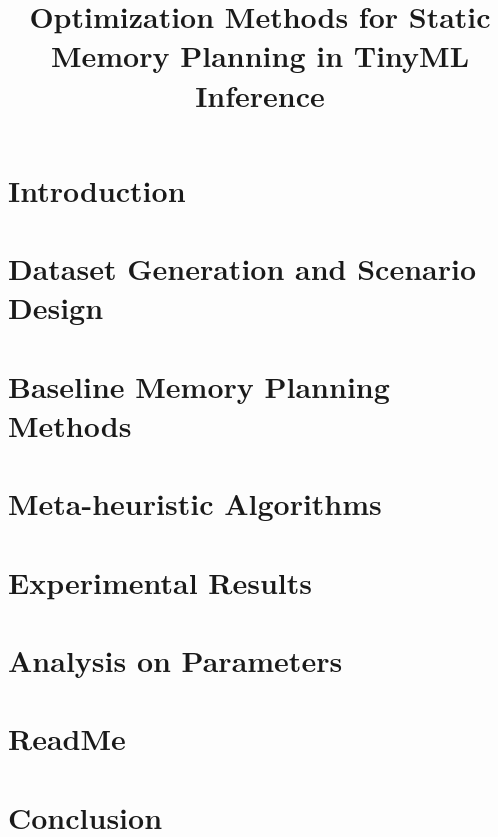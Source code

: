 \documentclass[12pt,oneside,a4paper,english]{article}
\title{Optimization Methods for Static Memory Planning in TinyML Inference} %
\begin{document}


\newpage
\doublespacing
\renewcommand{\baselinestretch}{1}\normalsize
\tableofcontents
\renewcommand{\baselinestretch}{1}\normalsize
\thispagestyle{fancy} %




\newpage
{} 
\section{Introduction} \label{ch1}
 

\section{Dataset Generation and Scenario Design} \label{ch2}
 


\section{Baseline Memory Planning Methods} \label{ch3}
 


\section{Meta-heuristic Algorithms} \label{ch4}
 



\section{Experimental Results}\label{ch5}
 


\section{Analysis on Parameters}\label{ch6}
 


\section{ReadMe}\label{ch7}
 




\section{Conclusion} \label{ch8}
 





\label{EndOfText}
\end{document}
